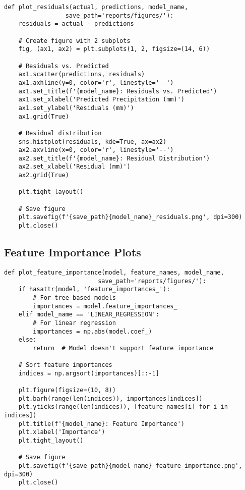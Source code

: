 \documentclass[12pt]{article}
\begin{document}
\begin{verbatim}
def plot_residuals(actual, predictions, model_name, 
                 save_path='reports/figures/'):
    residuals = actual - predictions
    
    # Create figure with 2 subplots
    fig, (ax1, ax2) = plt.subplots(1, 2, figsize=(14, 6))
    
    # Residuals vs. Predicted
    ax1.scatter(predictions, residuals)
    ax1.axhline(y=0, color='r', linestyle='--')
    ax1.set_title(f'{model_name}: Residuals vs. Predicted')
    ax1.set_xlabel('Predicted Precipitation (mm)')
    ax1.set_ylabel('Residuals (mm)')
    ax1.grid(True)
    
    # Residual distribution
    sns.histplot(residuals, kde=True, ax=ax2)
    ax2.axvline(x=0, color='r', linestyle='--')
    ax2.set_title(f'{model_name}: Residual Distribution')
    ax2.set_xlabel('Residual (mm)')
    ax2.grid(True)
    
    plt.tight_layout()
    
    # Save figure
    plt.savefig(f'{save_path}{model_name}_residuals.png', dpi=300)
    plt.close()
\end{verbatim}

\subsection{Feature Importance Plots}
\label{subsec:feature_importance}

\begin{verbatim}
def plot_feature_importance(model, feature_names, model_name, 
                          save_path='reports/figures/'):
    if hasattr(model, 'feature_importances_'):
        # For tree-based models
        importances = model.feature_importances_
    elif model_name == 'LINEAR_REGRESSION':
        # For linear regression
        importances = np.abs(model.coef_)
    else:
        return  # Model doesn't support feature importance
    
    # Sort feature importances
    indices = np.argsort(importances)[::-1]
    
    plt.figure(figsize=(10, 8))
    plt.barh(range(len(indices)), importances[indices])
    plt.yticks(range(len(indices)), [feature_names[i] for i in indices])
    plt.title(f'{model_name}: Feature Importance')
    plt.xlabel('Importance')
    plt.tight_layout()
    
    # Save figure
    plt.savefig(f'{save_path}{model_name}_feature_importance.png', dpi=300)
    plt.close()
\end{verbatim}
\end{document}
